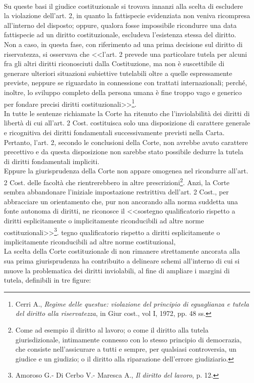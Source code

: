 \\Su queste basi il giudice costituzionale si trovava innanzi alla scelta di escludere la violazione dell’art. 2, in quanto la fattispecie evidenziata non veniva ricompresa all'interno del disposto; oppure, qualora fosse impossibile ricondurre una data fattispecie ad un diritto costituzionale, escludeva l’esistenza stessa del diritto.
Non a caso, in questa fase, con riferimento ad una prima decisione sul diritto di riservatezza, si osservava che <<l’art. 2 prevede una particolare tutela per alcuni fra gli altri diritti riconosciuti dalla Costituzione, ma non è suscettibile di generare ulteriori situazioni subiettive tutelabili oltre a quelle espressamente previste, neppure se riguardato in connessione con trattati internazionali; perché, inoltre, lo sviluppo completo della persona umana è fine troppo vago e generico per fondare precisi diritti costituzionali>>\footnote{Cerri A., \textit{Regime delle questue: violazione del principio di eguaglianza e tutela del diritto alla riservatezza}, in Giur cost., vol I, 1972, pp. 48 ss.}.
\\In tutte le sentenze richiamate la Corte ha ritenuto che l’inviolabilità dei diritti di libertà di cui all’art. 2 Cost. costituisca solo una disposizione di carattere generale e ricognitiva dei diritti fondamentali successivamente previsti nella Carta. 
Pertanto, l’art. 2, secondo le conclusioni della Corte, non avrebbe avuto carattere precettivo e da questa disposizione non sarebbe stato possibile dedurre la tutela di diritti fondamentali impliciti.
\\Eppure la giurisprudenza della Corte non appare omogenea nel ricondurre all’art. 2 Cost. delle facoltà che rientrerebbero in altre prescrizioni\footnote{Come ad esempio il diritto al lavoro; o come il diritto alla tutela giurisdizionale, intimamente connesso con lo stesso principio di democrazia, che consiste nell’assicurare a tutti e sempre, per qualsiasi controversia, un giudice e un giudizio; o il diritto alla riparazione dell’errore giudiziario.}. Anzi, la Corte sembra abbandonare l’iniziale impostazione restrittiva dell’art. 2 Cost., per abbracciare un orientamento che, pur non ancorando alla norma suddetta una fonte autonoma di diritti, ne riconosce il <<sostegno qualificatorio rispetto a diritti esplicitamente o implicitamente riconducibili ad altre norme costituzionali>>\footnote{Amoroso G.- Di Cerbo V.- Maresca A., \textit{Il diritto del lavoro}, p. 12.}. tegno qualificatorio rispetto a diritti esplicitamente o implicitamente riconducibili ad altre norme costituzional,
\\La scelta della Corte costituzionale di non rimanere strettamente ancorata alla sua prima giurisprudenza ha contribuito a delineare schemi all'interno di cui si muove la problematica dei diritti inviolabili, al fine di ampliare i margini di tutela, definibili in tre figure: 

